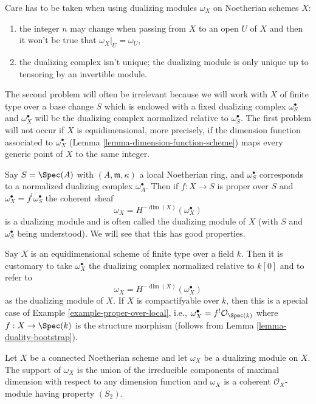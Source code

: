 \medskip\noindent
Care has to be taken when using dualizing modules $\omega_X$ on Noetherian
schemes $X$:
\begin{enumerate}
\item the integer $n$ may change when passing from $X$ to an open $U$
of $X$ and then it won't be true that $\omega_X|_U = \omega_U$,
\item the dualizing complex isn't unique; the dualizing module
is only unique up to tensoring by an invertible module.
\end{enumerate}
The second problem will often be irrelevant because we will work
with $X$ of finite type over a base change $S$ which is
endowed with a fixed dualizing complex $\omega_S^\bullet$ and
$\omega_X^\bullet$ will be the dualizing complex normalized relative
to $\omega_S^\bullet$.
The first problem will not occur if $X$ is equidimensional, more precisely,
if the dimension function associated to $\omega_X^\bullet$
(Lemma \ref{lemma-dimension-function-scheme})
maps every generic point of $X$ to the same integer.

\begin{example}
\label{example-proper-over-local}
Say $S = \Spec(A)$ with $(A, \mathfrak m, \kappa)$
a local Noetherian ring, and $\omega_S^\bullet$ corresponds to
a normalized dualizing complex $\omega_A^\bullet$. Then if
$f : X \to S$ is proper over $S$ and $\omega_X^\bullet = f^!\omega_S^\bullet$
the coherent sheaf
$$
\omega_X = H^{-\dim(X)}(\omega_X^\bullet)
$$
is a dualizing module and is often called the dualizing module
of $X$ (with $S$ and $\omega_S^\bullet$ being understood). We will
see that this has good properties.
\end{example}

\begin{example}
\label{example-equidimensional-over-field}
Say $X$ is an equidimensional scheme of finite type
over a field $k$. Then it is customary to take
$\omega_X^\bullet$ the dualizing complex normalized relative to $k[0]$
and to refer to
$$
\omega_X = H^{-\dim(X)}(\omega_X^\bullet)
$$
as the dualizing module of $X$. If $X$ is compactifyable over $k$,
then this is a special case of Example \ref{example-proper-over-local}, i.e.,
$\omega_X^\bullet = f^!\mathcal{O}_{\Spec(k)}$ where
$f : X \to \Spec(k)$ is the structure morphism (follows from
Lemma \ref{lemma-duality-bootstrap}).
\end{example}

\begin{lemma}
\label{lemma-dualizing-module}
Let $X$ be a connected Noetherian scheme and let $\omega_X$ be a dualizing
module on $X$. The support of $\omega_X$ is the union of the irreducible
components of maximal dimension with respect to any dimension function
and $\omega_X$ is a coherent $\mathcal{O}_X$-module having property $(S_2)$.
\end{lemma}

